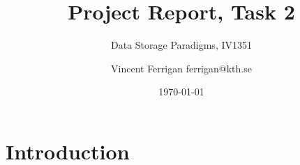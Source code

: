 \documentclass[a4paper]{scrartcl}
\title{Project Report, Task 2}
\subtitle{Data Storage Paradigms, IV1351}
\author{Vincent Ferrigan ferrigan@kth.se}
\date{\today}
\begin{document}
\maketitle
    







\section{Introduction}


\end{document}
